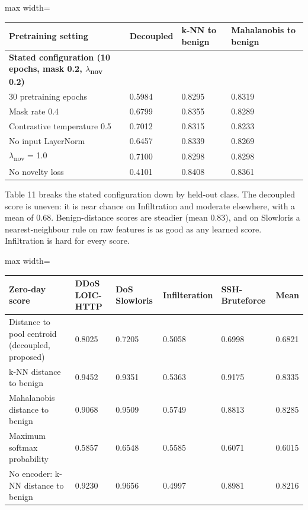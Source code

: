 \documentclass[10pt,a4paper]{article}
\begin{document}
\begin{center}
\begin{adjustbox}{max width=\linewidth}\small
\begin{tabular}{llll}
\toprule
{\bfseries\boldmath Pretraining setting} & {\bfseries\boldmath Decoupled} & {\bfseries\boldmath k-NN to benign} & {\bfseries\boldmath Mahalanobis to benign} \\
\midrule
{\bfseries\boldmath Stated configuration (10 epochs, mask 0.2, $\lambda$\textsubscript{nov} 0.2)} & {\bfseries\boldmath 0.6821} & {\bfseries\boldmath 0.8335} & {\bfseries\boldmath 0.8285} \\
30 pretraining epochs & 0.5984 & 0.8295 & 0.8319 \\
Mask rate 0.4 & 0.6799 & 0.8355 & 0.8289 \\
Contrastive temperature 0.5 & 0.7012 & 0.8315 & 0.8233 \\
No input LayerNorm & 0.6457 & 0.8339 & 0.8269 \\
$\lambda$\textsubscript{nov} = 1.0 & 0.7100 & 0.8298 & 0.8298 \\
No novelty loss & 0.4101 & 0.8408 & 0.8361 \\
\bottomrule
\end{tabular}
\end{adjustbox}
\end{center}
Table 11 breaks the stated configuration down by held-out class. The decoupled score is uneven: it is near chance on Infiltration and moderate elsewhere, with a mean of 0.68. Benign-distance scores are steadier (mean 0.83), and on Slowloris a nearest-neighbour rule on raw features is as good as any learned score. Infiltration is hard for every score.

\begin{center}
\begin{adjustbox}{max width=\linewidth}\small
\begin{tabular}{llllll}
\toprule
{\bfseries\boldmath Zero-day score} & {\bfseries\boldmath DDoS LOIC-HTTP} & {\bfseries\boldmath DoS Slowloris} & {\bfseries\boldmath Infilteration} & {\bfseries\boldmath SSH-Bruteforce} & {\bfseries\boldmath Mean} \\
\midrule
Distance to pool centroid (decoupled, proposed) & 0.8025 & 0.7205 & 0.5058 & 0.6998 & 0.6821 \\
k-NN distance to benign & 0.9452 & 0.9351 & 0.5363 & 0.9175 & 0.8335 \\
Mahalanobis distance to benign & 0.9068 & 0.9509 & 0.5749 & 0.8813 & 0.8285 \\
Maximum softmax probability & 0.5857 & 0.6548 & 0.5585 & 0.6071 & 0.6015 \\
No encoder: k-NN distance to benign & 0.9230 & 0.9656 & 0.4997 & 0.8981 & 0.8216 \\
\bottomrule
\end{tabular}
\end{adjustbox}
\end{center}
\end{document}
